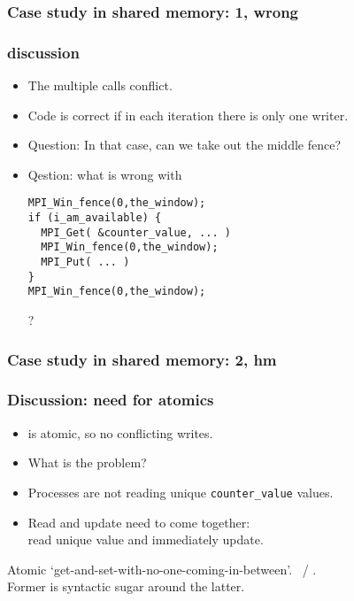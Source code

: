 \begin{mpithree}
\begin{frame}[containsverbatim]\frametitle{Case study in shared memory: 1, wrong}
  \label{sl:fetchput}
\end{frame}

\begin{frame}[containsverbatim]\frametitle{discussion}
  \begin{itemize}
  \item The multiple  calls conflict.
  \item Code is correct if in each iteration there is only one writer.
  \item Question: In that case, can we take out the middle fence?
  \item Qestion: what is wrong with
\begin{lstlisting}
MPI_Win_fence(0,the_window);
if (i_am_available) {
  MPI_Get( &counter_value, ... )
  MPI_Win_fence(0,the_window);
  MPI_Put( ... )      
}
MPI_Win_fence(0,the_window);
\end{lstlisting}
?
  \end{itemize}
\end{frame}

\begin{frame}[containsverbatim]\frametitle{Case study in shared memory: 2, hm}
  \label{sl:fetchacc}
\end{frame}

\begin{frame}[containsverbatim]\frametitle{Discussion: need for atomics}
  \label{sl:fetchop}
  \begin{itemize}
  \item {} is atomic, so no conflicting writes.
  \item What is the problem?
  \item Processes are not reading unique \lstinline+counter_value+ values.
  \item Read and update need to come together:\\
    read unique value and immediately update.
  \end{itemize}
  Atomic `get-and-set-with-no-one-coming-in-between'.
  ~/ .\\
  Former is syntactic sugar around the latter.
\end{frame}


\end{mpithree}
